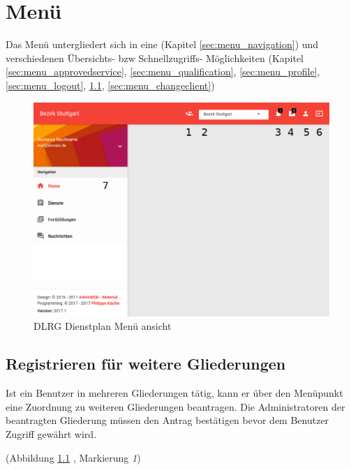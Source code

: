 \chapter{Menü}
\label{cha:menu}

Das Menü untergliedert sich in eine  (Kapitel \ref{sec:menu_navigation}) und verschiedenen Übersichts- bzw Schnellzugriffs- Möglichkeiten (Kapitel \ref{sec:menu_approvedservice}, \ref{sec:menu_qualification}, \ref{sec:menu_profile}, \ref{sec:menu_logout}, \ref{sec:menu_applyclient}, \ref{sec:menu_changeclient})

\begin{figure}[h]
 \begin{addmargin}{-0.2\linewidth}
   \centering 
   \includegraphics[width=14cm]{Bilder/view_menu.png}
 \end{addmargin} 
 \caption[Menü ansicht]{DLRG Dienstplan Menü ansicht}
 \label{fig:view_menu}
\end{figure}

\section{Registrieren für weitere Gliederungen}
\label{sec:menu_applyclient}
Ist ein Benutzer in mehreren Gliederungen tätig, kann er über den Menüpunkt eine Zuordnung zu weiteren Gliederungen beantragen. Die Administratoren der beantragten Gliederung müssen den Antrag bestätigen bevor dem Benutzer Zugriff gewährt wird.

\noindent (Abbildung \ref{fig:view_menu} \textit{}, Markierung \textit{1})

